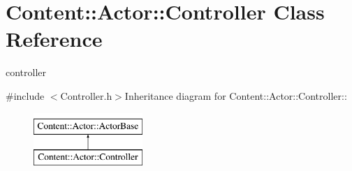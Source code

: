 \hypertarget{classContent_1_1Actor_1_1Controller}{
\section{Content::Actor::Controller Class Reference}
\label{classContent_1_1Actor_1_1Controller}
}


controller  


{\ttfamily \#include $<$Controller.h$>$}Inheritance diagram for Content::Actor::Controller::\begin{figure}[H]
\begin{center}
\leavevmode
\includegraphics[height=2cm]{classContent_1_1Actor_1_1Controller}
\end{center}
\end{figure}
